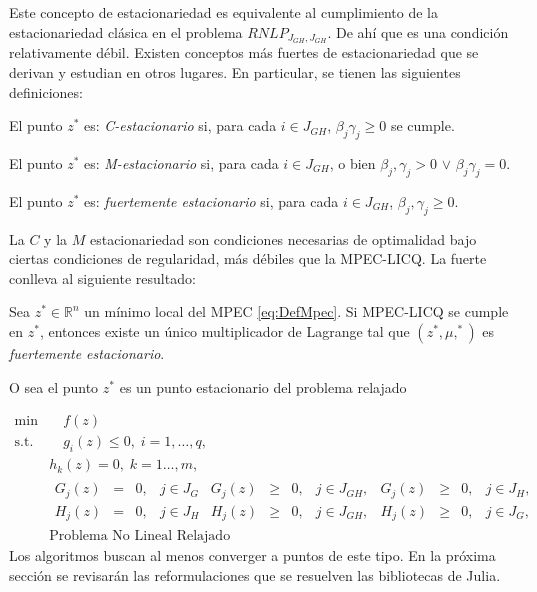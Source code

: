 Este concepto de estacionariedad es equivalente al cumplimiento de la estacionariedad cl\'asica en el problema $RNLP_{J_{GH},J_{GH}}$. De ah\'i que  es una condición relativamente débil. Existen conceptos más fuertes de estacionariedad que se derivan y estudian en otros lugares. En particular, se tienen las siguientes definiciones:

 \begin{definition}
  El punto $z^*$ es: \textit{C-estacionario} si, para cada $i \in J_{GH}$, $\beta_j\gamma_j \geq 0$ se cumple.
\end{definition}
\begin{definition}
    El punto $z^*$ es: \textit{M-estacionario} si, para cada $i \in J_{GH}$, o bien $\beta_j,\gamma_j > 0$ $\vee$ $\beta_j \gamma_j = 0$.
\end{definition}
 \begin{definition}
    El punto $z^*$ es: \textit{fuertemente estacionario}  si, para cada $i \in J_{GH}$, $\beta_j, \gamma_j \geq 0$.
\end{definition}


La $C$ y la $M$ estacionariedad  son condiciones necesarias de optimalidad bajo ciertas condiciones de regularidad, m\'as débiles que la  MPEC-LICQ. La fuerte conlleva al siguiente resultado:
\begin{theorem} 
Sea $z^* \in \mathbb{R}^n$ un mínimo local del MPEC \eqref{eq:DefMpec}. Si MPEC-LICQ se cumple en $z^*$, entonces existe un único multiplicador de Lagrange  tal que $(z^*, \mu, ^*)$ es \textit{fuertemente estacionario}.
\end{theorem}
O sea el punto $z^*$ es un punto estacionario del problema relajado 

\begin{equation}
\begin{array}{cl}
\min  &\quad  f(z)  \\
\text{s.t.} &\quad  g_i(z) \leq 0, \;i=1,\ldots,q, \\ &h_k(z) = 0,\;k=1\ldots,m, \\
&\begin{array}{ccccccccccccccccc}G_j(z) &=& 0, & j\in J_G& G_j(z) &\geq& 0, &j\in J_{GH},& G_j(z) &\geq& 0, & j\in J_H,\\ 
H_j(z) &=& 0, & j\in J_H& H_j(z) &\geq& 0, & j\in J_{GH},& H_j(z) &\geq& 0, & j\in J_G,\end{array}\\
& \text{Problema No Lineal Relajado }  
\end{array}
\label{eRNLP}
\end{equation}Los algoritmos buscan al menos converger a puntos de este tipo.  En la pr\'oxima sección se revisar\'an las reformulaciones que se resuelven  las bibliotecas de Julia.
